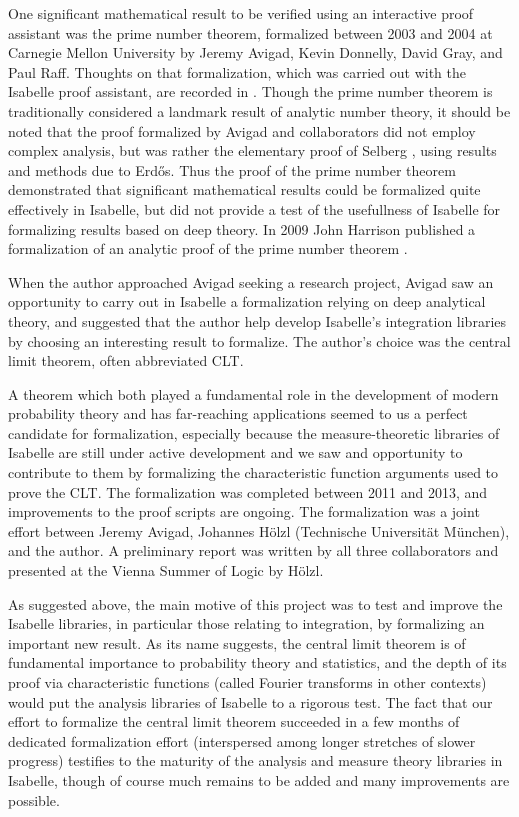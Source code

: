 \documentclass{article}
\theoremstyle{definition}
\begin{document}
One significant mathematical result to be verified using an interactive proof assistant was the prime number theorem, formalized between 2003 and 2004 at Carnegie Mellon University by Jeremy Avigad, Kevin Donnelly, David Gray, and Paul Raff. Thoughts on that formalization, which was carried out with the Isabelle proof assistant, are recorded in \cite{avigad-etal-pnt}. Though the prime number theorem is traditionally considered a landmark result of analytic number theory, it should be noted that the proof formalized by Avigad and collaborators did not employ complex analysis, but was rather the elementary proof of Selberg \cite{selberg-pnt}, using results and methods due to Erd{\H{o}}s. Thus the proof of the prime number theorem demonstrated that significant mathematical results could be formalized quite effectively in Isabelle, but did not provide a test of the usefullness of Isabelle for formalizing results based on deep theory. In 2009 John Harrison published a formalization of an analytic proof of the prime number theorem \cite{harrison-pnt}.

When the author approached Avigad seeking a research project, Avigad saw an opportunity to carry out in Isabelle a formalization relying on deep analytical theory, and suggested that the author help develop Isabelle's integration libraries by choosing an interesting result to formalize. The author's choice was the central limit theorem, often abbreviated CLT.

A theorem which both played a fundamental role in the development of modern probability theory and has far-reaching applications seemed to us a perfect candidate for formalization, especially because the measure-theoretic libraries of Isabelle are still under active development and we saw and opportunity to contribute to them by formalizing the characteristic function arguments used to prove the CLT. The formalization was completed between 2011 and 2013, and improvements to the proof scripts are ongoing. The formalization was a joint effort between Jeremy Avigad, Johannes H\"olzl (Technische Universit\"at M\"unchen), and the author. A preliminary report \cite{prelim} was written by all three collaborators and presented at the Vienna Summer of Logic by H\"olzl.

As suggested above, the main motive of this project was to test and improve the Isabelle libraries, in particular those relating to integration, by formalizing an important new result. As its name suggests, the central limit theorem is of fundamental importance to probability theory and statistics, and the depth of its proof via characteristic functions (called Fourier transforms in other contexts) would put the analysis libraries of Isabelle to a rigorous test. The fact that our effort to formalize the central limit theorem succeeded in a few months of dedicated formalization effort (interspersed among longer stretches of slower progress) testifies to the maturity of the analysis and measure theory libraries in Isabelle, though of course much remains to be added and many improvements are possible.
\end{document}
